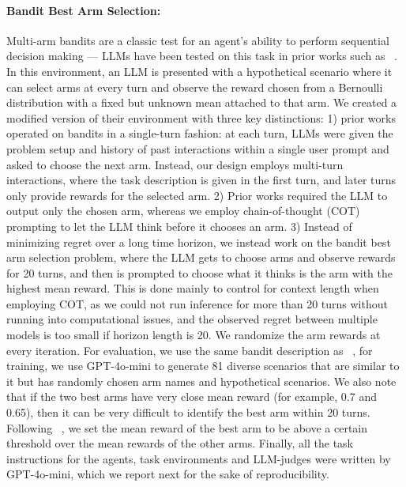 \documentclass{article}
\theoremstyle{plain}
\theoremstyle{definition}
\theoremstyle{remark}
\begin{document}
\paragraph{Bandit Best Arm Selection: } Multi-arm bandits are a classic test for an agent's ability to perform sequential decision making --- LLMs have been tested on this task in prior works such as ~\citet{krishnamurthy2024largelanguagemodelsexplore,nie2024evolveevaluatingoptimizingllms}. In this environment, an LLM is presented with a hypothetical scenario where it can select arms at every turn and observe the reward chosen from a Bernoulli distribution with a fixed but unknown mean attached to that arm. We created a modified version of their environment with three key distinctions: 1) prior works operated on bandits in a single-turn fashion: at each turn, LLMs were given the problem setup and history of past interactions within a single user prompt and asked to choose the next arm. Instead, our design employs multi-turn interactions, where the task description is given in the first turn, and later turns only provide rewards for the selected arm. 2) Prior works required the LLM to output only the chosen arm, whereas we employ chain-of-thought (COT) prompting to let the LLM think before it chooses an arm. 3) Instead of minimizing regret over a long time horizon, we instead work on the bandit best arm selection problem, where the LLM gets to choose arms and observe rewards for 20 turns, and then is prompted to choose what it thinks is the arm with the highest mean reward. This is done mainly to control for context length when employing COT, as we could not run inference for more than 20 turns without running into computational issues, and the observed regret between multiple models is too small if horizon length is 20. We randomize the arm rewards at every iteration. For evaluation, we use the same bandit description as ~\citet{krishnamurthy2024largelanguagemodelsexplore}, for training, we use GPT-4o-mini to generate 81 diverse scenarios that are similar to it but has randomly chosen arm names and hypothetical scenarios. We also note that if the two best arms have very close mean reward (for example, 0.7 and 0.65), then it can be very difficult to identify the best arm within 20 turns. Following ~\citet{krishnamurthy2024largelanguagemodelsexplore,nie2024evolveevaluatingoptimizingllms}, we set the mean reward of the best arm to be above a certain threshold over the mean rewards of the other arms.
Finally, all the task instructions for the agents, task environments and LLM-judges were written by GPT-4o-mini, which we report next for the sake of reproducibility.
\end{document}
